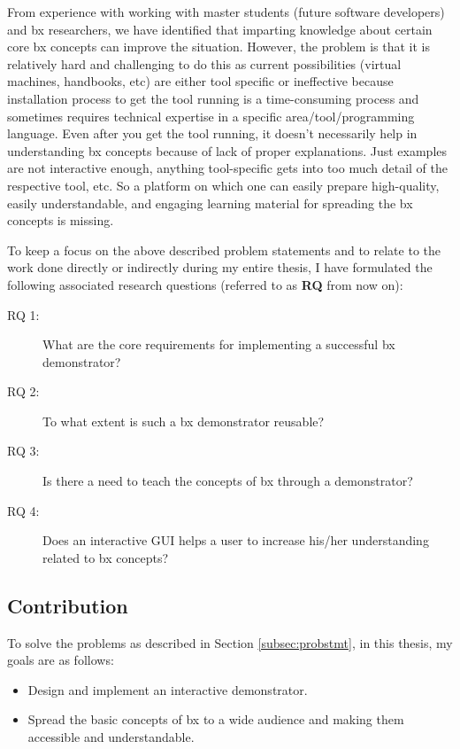 From experience with working with master students (future software developers) and bx researchers, we have identified that imparting knowledge about certain core bx concepts can improve the situation. However, the problem is that it is relatively hard and challenging to do this as current possibilities (virtual machines, handbooks, etc) are either tool specific or ineffective because installation process to get the tool running is a time-consuming process and sometimes requires technical expertise in a specific area/tool/programming language. Even after you get the tool running, it doesn't necessarily help in understanding bx concepts because of lack of proper explanations. Just examples are not interactive enough, anything tool-specific gets into too much detail of the respective tool, etc. So a platform on which one can easily prepare high-quality, easily understandable, and engaging learning material for spreading the bx concepts is missing.

To keep a focus on the above described problem statements and to relate to the work done directly or indirectly during my entire thesis, I have formulated the following associated research questions (referred to as \textbf{RQ} from now on):

\begin{description}
	\item [RQ 1:] What are the core requirements for implementing a successful bx demonstrator?
	\item [RQ 2:] To what extent is such a bx demonstrator reusable?
	\item [RQ 3:] Is there a need to teach the concepts of bx through a demonstrator?
	\item [RQ 4:] Does an interactive GUI helps a user to increase his/her understanding related to bx concepts?
\end{description}

\subsection{Contribution}\label{subsec:contribution}
To solve the problems as described in Section \ref{subsec:probstmt}, in this thesis, my goals are as follows:
\begin{itemize} 
\item {Design and implement an interactive demonstrator.} 
\item {Spread the basic concepts of bx to a wide audience and making them accessible and understandable.}
\end{itemize}

